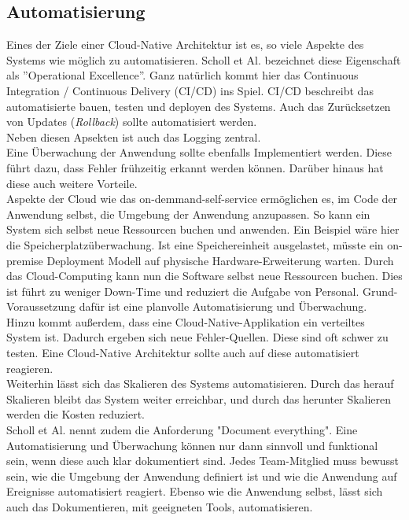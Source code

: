\subsection{Automatisierung}
Eines der Ziele einer Cloud-Native Architektur ist es, so viele Aspekte des Systems wie möglich zu automatisieren. Scholl et Al.\cite{scholl_cloud_2019} bezeichnet diese Eigenschaft als ''Operational Excellence''. Ganz natürlich kommt hier das Continuous Integration / Continuous Delivery (CI/CD) ins Spiel. CI/CD beschreibt das automatisierte bauen, testen und deployen des Systems. Auch das Zurücksetzen von Updates (\textit{Rollback}) sollte automatisiert werden.\\
Neben diesen Apsekten ist auch das Logging zentral. \\
Eine Überwachung der Anwendung sollte ebenfalls Implementiert werden. Diese führt dazu, dass Fehler frühzeitig erkannt werden können. Darüber hinaus hat diese auch weitere Vorteile.\\
Aspekte der Cloud wie das on-demmand-self-service ermöglichen es, im Code der Anwendung selbst, die Umgebung der Anwendung anzupassen. So kann ein System sich selbst neue Ressourcen buchen und anwenden. Ein Beispiel wäre hier die Speicherplatzüberwachung. Ist eine Speichereinheit ausgelastet, müsste ein on-premise Deployment Modell auf physische Hardware-Erweiterung warten. Durch das Cloud-Computing kann nun die Software selbst neue Ressourcen buchen. Dies ist führt zu weniger Down-Time und reduziert die Aufgabe von Personal. Grund-Voraussetzung dafür ist eine planvolle Automatisierung und Überwachung.\\ 
Hinzu kommt außerdem, dass eine Cloud-Native-Applikation ein verteiltes System ist. Dadurch ergeben sich neue Fehler-Quellen. Diese sind oft schwer zu testen. Eine Cloud-Native Architektur sollte auch auf diese automatisiert reagieren.\\
Weiterhin lässt sich das Skalieren des Systems automatisieren. Durch das herauf Skalieren bleibt das System weiter erreichbar, und durch das herunter Skalieren werden die Kosten reduziert.\\
Scholl et Al.\cite{scholl_cloud_2019} nennt zudem die Anforderung "Document everything". Eine Automatisierung und Überwachung können nur dann sinnvoll und funktional sein, wenn diese auch klar dokumentiert sind. Jedes Team-Mitglied muss bewusst sein, wie die Umgebung der Anwendung definiert ist und wie die Anwendung auf Ereignisse automatisiert reagiert. Ebenso wie die Anwendung selbst, lässt sich auch das Dokumentieren, mit geeigneten Tools, automatisieren.
